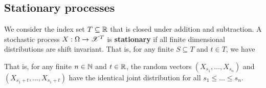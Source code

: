 \documentclass[letterpaper,10pt,english]{article}
\begin{document}
\subsection{Stationary processes}
\begin{defn}
We consider the index set $T \subseteq \mathbb{R}$ that is closed under addition and subtraction.   
A stochastic process $X: \Omega \to \mathscr{X}^T$ is \textbf{stationary} if all finite dimensional distributions are shift invariant. 
That is, for any finite $S \subseteq T$ and $t \in T$, we have 
\end{defn}
\begin{rem} 
That is, for any finite $n \in \mathbb{N}$ and $t \in \mathbb{R}$, the random vectors $(X_{s_1}, \dots, X_{s_n})$ and $(X_{s_1+t}, \dots, X_{s_1+t})$ have the identical joint distribution for all $s_1 \le \dots \le s_n$.  
\end{rem}
\end{document}
